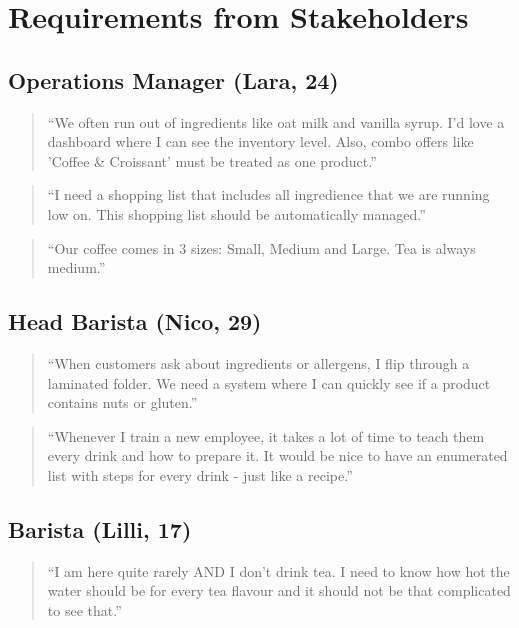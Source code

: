 \section{Requirements from Stakeholders}

\subsection{Operations Manager (Lara, 24)}

\begin{quote}
    “We often run out of ingredients like oat milk and vanilla syrup. I'd love a dashboard where I can see the inventory level. Also, combo offers like 'Coffee \& Croissant' must be treated as one product.”
\end{quote}

\begin{quote}
    “I need a shopping list that includes all ingredience that we are running low on. This shopping list should be automatically managed.”
\end{quote}

\begin{quote}
    “Our coffee comes in 3 sizes: Small, Medium and Large. Tea is always medium.”
\end{quote}

\subsection{Head Barista (Nico, 29)}

\begin{quote}
    “When customers ask about ingredients or allergens, I flip through a laminated folder. We need a system where I can quickly see if a product contains nuts or gluten.”
\end{quote}

\begin{quote}
    “Whenever I train a new employee, it takes a lot of time to teach them every drink and how to prepare it. It would be nice to have an enumerated list with steps for every drink - just like a recipe.”
\end{quote}

\subsection{Barista (Lilli, 17)}

\begin{quote}
    “I am here quite rarely AND I don't drink tea. I need to know how hot the water should be for every tea flavour and it should not be that complicated to see that.”
\end{quote}

